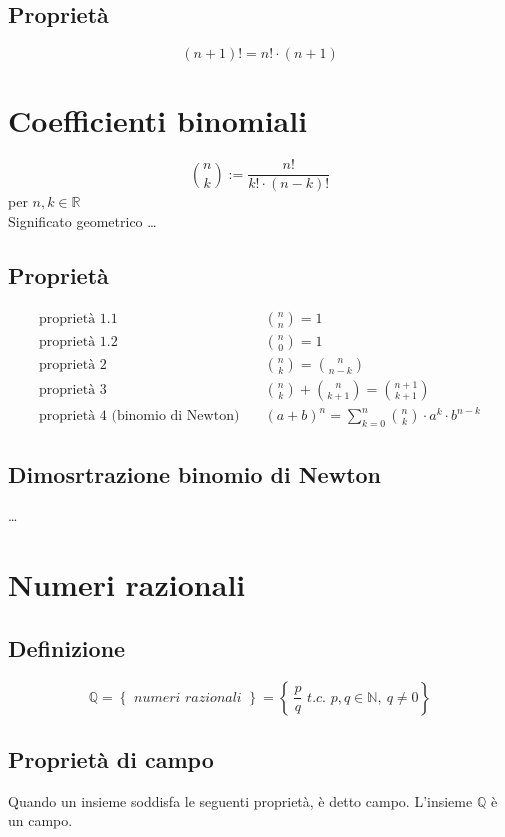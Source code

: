\documentclass[a4paper]{article}
\begin{document}
\subsection{Proprietà}
\[(n + 1)! = n! \cdot (n + 1)\]

\section{Coefficienti binomiali}
\[\binom{n}{k} := \frac{n!}{k! \cdot (n - k)!}\]
per \(n, k \in \mathbb{R}\) \\
Significato geometrico \dots

\subsection{Proprietà}
\begin{align*}
	\text{proprietà 1.1} \quad & \binom{n}{n} = 1 \\
	\text{proprietà 1.2} \quad & \binom{n}{0} = 1 \\
	\text{proprietà 2} \quad & \binom{n}{k} = \binom{n}{n-k} \\
	\text{proprietà 3} \quad & \binom{n}{k} + \binom{n}{k+1} = \binom{n+1}{k+1} \\
	\text{proprietà 4 (binomio di Newton)} \quad & (a + b) ^ n = \sum_{k = 0} ^ {n} \binom{n}{k} \cdot a ^ k \cdot b ^ {n - k}
\end{align*}

\subsection{Dimosrtrazione binomio di Newton}
\dots

\newpage

\section{Numeri razionali}
\subsection{Definizione}
\[\mathbb{Q} = \left\{ \textit{ numeri razionali } \right\} = \left\{ \  \frac{p}{q} \textit{ t.c. } p,q \in \mathbb{N}, \  q \neq 0 \right\}\]

\subsection{Proprietà di campo}
Quando un insieme soddisfa le seguenti proprietà, è detto campo. L'insieme \(\mathbb{Q}\) è un campo.
\end{document}
